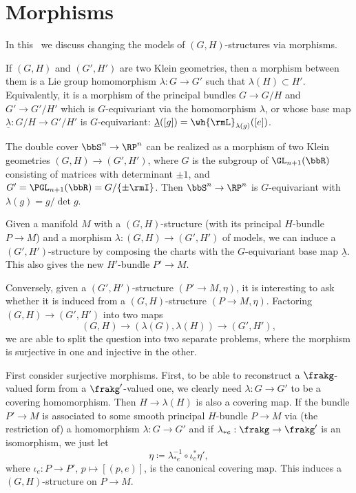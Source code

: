 \section{Morphisms}\label{sec: morphisms of klein geom}

In this \sect\ we discuss changing the models of $(G,H)$-structures via morphisms.

\begin{defn}
    If $(G,H)$ and $(G',H')$ are two Klein geometries, then a morphism between them is a Lie group homomorphism $\lambda:G\to G'$ such that $\lambda(H)\subset H'$. Equivalently, it is a morphism of the principal bundles $G\to G\slash H$ and $G'\to G'\slash H'$ which is $G$-equivariant via the homomorphism $\lambda$, or whose base map $\underline{\lambda}:G\slash H\to G'\slash H'$ is $G$-equivariant: $\underline{\lambda}([g])=\wh{\rmL}_{\lambda(g)}([e])$.
\end{defn}

\begin{example}
    The double cover $\bbS^n\to \RP^n$ can be realized as a morphism of two Klein geometries $(G,H)\to (G',H')$, where $G$ is the subgroup of $\GL_{n+1}(\bbR)$ consisting of matrices with determinant $\pm 1$, and $G'=\PGL_{n+1}(\bbR)=G\slash \{\pm \rmI\}$. Then $\bbS^n\to \RP^n$ is $G$-equivariant with $\lambda(g)=g/\det g$.
\end{example}

Given a manifold $M$ with a $(G,H)$-structure (with its principal $H$-bundle $P\to M$) and a morphism $\lambda:(G,H)\to (G',H')$ of models, we can induce a $(G',H')$-structure by composing the charts with the $G$-equivariant base map $\underline{\lambda}$. This also gives the new $H'$-bundle $P'\to M$.

Conversely, given a $(G',H')$-structure $(P'\to M,\eta)$, it is interesting to ask whether it is induced from a $(G,H)$-structure $(P\to M,\eta)$. Factoring $(G,H)\to (G',H')$ into two maps 
\[(G,H)\to (\lambda(G),\lambda(H))\to (G',H'),\]
we are able to split the question into two separate problems, where the morphism is surjective in one and injective in the other.

First consider surjective morphisms. First, to be able to reconstruct a $\frakg$-valued form from a $\frakg'$-valued one, we clearly need $\lambda:G\to G'$ to be a covering homomorphism. Then $H\to \lambda(H)$ is also a covering map. If the bundle $P'\to M$ is associated to some smooth principal $H$-bundle $P\to M$ via (the restriction of) a homomorphism $\lambda:G\to G'$ and if $\lambda_{\ast e}:\frakg\to \frakg'$ is an isomorphism, we just let 
\[\eta\coloneqq \lambda^{-1}_{\ast e}\circ \iota_e^\ast \eta',\] where $\iota_e:P\to P'$, $p\mapsto [(p,e)]$, is the canonical covering map. This induces a $(G,H)$-structure on $P\to M$. 

